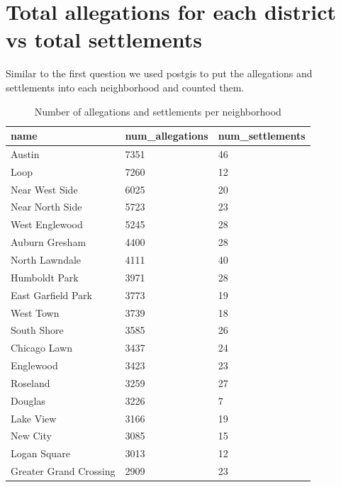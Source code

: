 \documentclass{article}
\begin{document}
\section{Total allegations for each district vs total settlements}
Similar to the first question we used postgis to put the allegations and settlements into each neighborhood and counted them.

\begin{table}[h!]
\centering
\caption{Number of allegations and settlements per neighborhood}
\label{table4}
\begin{tabular}{|l|l|l|}
\hline
name                   & num\_allegations & num\_settlements \\
\hline
Austin                 & 7351             & 46               \\
Loop                   & 7260             & 12               \\
Near West Side         & 6025             & 20               \\
Near North Side        & 5723             & 23               \\
West Englewood         & 5245             & 28               \\
Auburn Gresham         & 4400             & 28               \\
North Lawndale         & 4111             & 40               \\
Humboldt Park          & 3971             & 28               \\
East Garfield Park     & 3773             & 19               \\
West Town              & 3739             & 18               \\
South Shore            & 3585             & 26               \\
Chicago Lawn           & 3437             & 24               \\
Englewood              & 3423             & 23               \\
Roseland               & 3259             & 27               \\
Douglas                & 3226             & 7                \\
Lake View              & 3166             & 19               \\
New City               & 3085             & 15               \\
Logan Square           & 3013             & 12               \\
Greater Grand Crossing & 2909             & 23               \\

\end{tabular}
\end{table}
\end{document}
